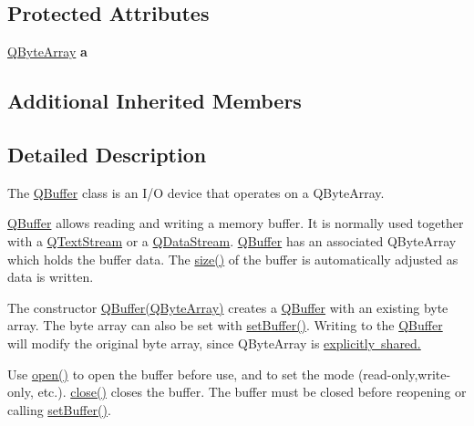 \subsection*{Protected Attributes}
\begin{DoxyCompactItemize}
\item 
\mbox{\label{class_q_buffer_a25221a1da1f29140c2fbb75dd0a5ee4e}} 
\mbox{\hyperlink{class_q_array}{Q\+Byte\+Array}} {\bfseries a}
\end{DoxyCompactItemize}
\subsection*{Additional Inherited Members}


\subsection{Detailed Description}
The \mbox{\hyperlink{class_q_buffer}{Q\+Buffer}} class is an I/O device that operates on a Q\+Byte\+Array. 

\mbox{\hyperlink{class_q_buffer}{Q\+Buffer}} allows reading and writing a memory buffer. It is normally used together with a \mbox{\hyperlink{class_q_text_stream}{Q\+Text\+Stream}} or a \mbox{\hyperlink{class_q_data_stream}{Q\+Data\+Stream}}. \mbox{\hyperlink{class_q_buffer}{Q\+Buffer}} has an associated Q\+Byte\+Array which holds the buffer data. The \mbox{\hyperlink{class_q_buffer_aa064f4e430cdd1babd400982881012a8}{size()}} of the buffer is automatically adjusted as data is written.

The constructor {\ttfamily \mbox{\hyperlink{class_q_buffer_ac88f81ed56581532b835e83812a8650a}{Q\+Buffer(\+Q\+Byte\+Array)}}} creates a \mbox{\hyperlink{class_q_buffer}{Q\+Buffer}} with an existing byte array. The byte array can also be set with \mbox{\hyperlink{class_q_buffer_ad4c608788c2730ca60295488f75da423}{set\+Buffer()}}. Writing to the \mbox{\hyperlink{class_q_buffer}{Q\+Buffer}} will modify the original byte array, since Q\+Byte\+Array is \mbox{\hyperlink{}{explicitly shared.}}

Use \mbox{\hyperlink{class_q_buffer_aa3ceff2217a13a570e0dcec157b23b18}{open()}} to open the buffer before use, and to set the mode (read-\/only,write-\/only, etc.). \mbox{\hyperlink{class_q_buffer_affd0b382476516b0d4e3adfaf27c0247}{close()}} closes the buffer. The buffer must be closed before reopening or calling \mbox{\hyperlink{class_q_buffer_ad4c608788c2730ca60295488f75da423}{set\+Buffer()}}.

